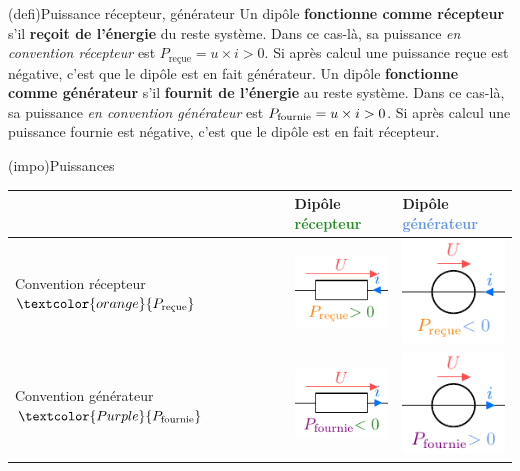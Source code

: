 \documentclass[../../main/main.tex]{subfiles}
\begin{document}
\begin{tcb}[label=def:puissance, sidebyside](defi){Puissance récepteur, générateur}
	Un dipôle \textbf{fonctionne comme récepteur} s'il \textbf{reçoit de
		l'énergie} du reste système. Dans ce cas-là, sa puissance \textit{en
		convention récepteur} est $P_{\text{reçue}} = u\times i > 0$. Si après calcul
	une puissance reçue est négative, c'est que le dipôle est en fait générateur.
	\tcblower
	Un dipôle \textbf{fonctionne comme générateur} s'il \textbf{fournit de
		l'énergie} au reste système. Dans ce cas-là, sa puissance \textit{en
		convention générateur} est $P_{\rm fournie} = u\times i > 0$. Si après calcul
	une puissance fournie est négative, c'est que le dipôle est en fait récepteur.
\end{tcb}

\begin{tcb}[label=impo:convrg](impo){Puissances}
	\begin{tabularx}{\linewidth}{|Y*{2}{|Y}|}\hline
		                                                     &
		Dipôle \textcolor{ForestGreen}{récepteur}            &
		Dipôle \textcolor{CornflowerBlue}{générateur}
		\\\hline
		Convention récepteur
		\smallbreak $\textcolor{orange}{P_{\text{reçue}}}$   &
		\includegraphics[width=3cm]{rconvr}
		                                                     &
		\includegraphics[width=3cm]{gconvr}
		\\\hline
		Convention générateur
		\smallbreak $\textcolor{Purple}{P_{\text{fournie}}}$ &
		\includegraphics[width=3cm]{rconvg}
		                                                     &
		\includegraphics[width=3cm]{gconvg}
		\\\hline
	\end{tabularx}
\end{tcb}
\end{document}
